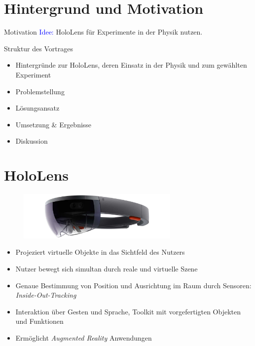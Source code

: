 \part{Hintergrund und Motivation}
\label{part:intro}

\begin{frame}[fragile]{Motivation}
\vspace{10px}
\textcolor{blue}{Idee:}  HoloLens für Experimente in der Physik nutzen.
\end{frame}

\begin{frame}[fragile]{Struktur des Vortrages}
\begin{itemize}
	\item Hintergründe zur HoloLens, deren Einsatz in der Physik und zum gewählten Experiment
	\item Problemstellung
	\item Lösungsansatz
	\item Umsetzung \& Ergebnisse
	\item Diskussion
\end{itemize}
\end{frame}

\part{HoloLens}
\label{part:hololens}
\begin{frame}[fragile]{}
\vspace{-5px}
\begin{figure}[h!]
	\centering
	\includegraphics[width=0.7\textwidth]{images/papers/hololens.jpg}
\end{figure}
\pause
\begin{itemize}
	\item Projeziert virtuelle Objekte in das Sichtfeld des Nutzers
	\item Nutzer bewegt sich simultan durch reale und virtuelle Szene
	\pause
	\item Genaue Bestimmung von Position und Ausrichtung im Raum durch Sensoren: \textit{Inside-Out-Tracking}
	\item Interaktion über Gesten und Sprache, Toolkit mit vorgefertigten Objekten und Funktionen
	\pause
	\item Ermöglicht \textit{Augmented Reality} Anwendungen
\end{itemize}	
\end{frame}

